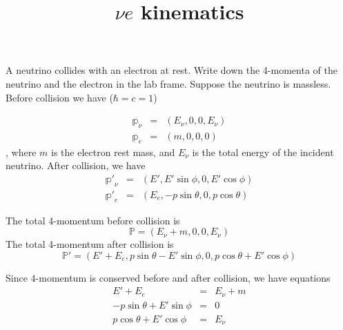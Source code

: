 \documentclass{beamer}
\date{}
\title{\texorpdfstring{$\nu e$}{nu-e} kinematics}
\begin{document}
\begin{frame}
\titlepage
\end{frame}
\begin{frame}[allowframebreaks]{}

\begin{figure}
\centering
\end{figure}


A neutrino collides with an electron at rest. Write down the 4-momenta of the neutrino and the electron in the lab frame. Suppose the neutrino is massless. Before collision we have ($\hbar=c=1$)

\framebreak

\begin{eqnarray}
\mathbb{p}_\nu &=&(E_\nu,0,0,E_\nu) \label{eq:pnu}\\
\mathbb{p}_e&=&(m,0,0,0) \label{eq:pe}
\end{eqnarray}
, where $m$ is the electron rest mass, and $E_\nu$ is the total energy of the incident neutrino.
After collision, we have
\begin{eqnarray}
\mathbb{p'}_\nu &=&(E',E'\sin\phi,0,E'\cos\phi) \label{eq:ppnu} \\
\mathbb{p'}_e &=& (E_e,-p\sin\theta,0,p\cos\theta) \label{eq:ppe}
\end{eqnarray}


The total 4-momentum before collision is
\begin{equation} \label{eq:ptot}
  \mathbb{P} = (E_\nu+m,0,0,E_\nu)
\end{equation}
The total 4-momentum after collision is
\begin{equation} \label{eq:pptot}
  \mathbb{P}' = (E'+E_e,p\sin\theta-E'\sin\phi,0,p\cos\theta+E'\cos\phi)
\end{equation}

\framebreak

Since 4-momentum is conserved before and after collision, we have equations
\begin{eqnarray}
  E'+E_e &=& E_\nu+m \label{eq:E} \\
  -p\sin\theta+E'\sin\phi &=& 0 \label{eq:ptotx} \\
  p\cos\theta+E'\cos\phi &=& E_\nu \label{eq:ptotz}
\end{eqnarray}


\end{frame}
\end{document}
